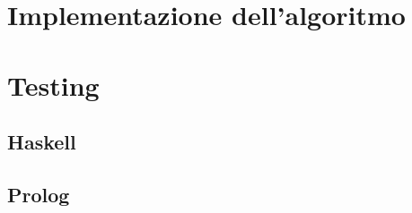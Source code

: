 \documentclass{report}
\begin{document}
	\chapter{Implementazione dell'algoritmo}

    \chapter{Testing}
    \section{Haskell}
    \section{Prolog}
	
\end{document}
